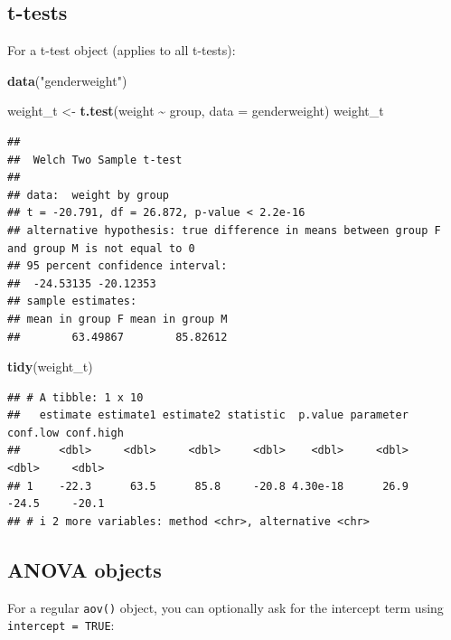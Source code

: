 \documentclass[
]{book}
\newenvironment{Shaded}{\begin{snugshade}}{\end{snugshade}}
\newcommand{\AttributeTok}[1]{\textcolor[rgb]{0.13,0.29,0.53}{#1}}
\newcommand{\FunctionTok}[1]{\textcolor[rgb]{0.13,0.29,0.53}{\textbf{#1}}}
\newcommand{\NormalTok}[1]{#1}
\newcommand{\OtherTok}[1]{\textcolor[rgb]{0.56,0.35,0.01}{#1}}
\newcommand{\SpecialCharTok}[1]{\textcolor[rgb]{0.81,0.36,0.00}{\textbf{#1}}}
\newcommand{\StringTok}[1]{\textcolor[rgb]{0.31,0.60,0.02}{#1}}
\begin{document}
\subsection{t-tests}\label{t-tests-1}

For a t-test object (applies to all t-tests):

\begin{Shaded}
\begin{Highlighting}[]
\FunctionTok{data}\NormalTok{(}\StringTok{"genderweight"}\NormalTok{)}

\NormalTok{weight\_t }\OtherTok{\textless{}{-}} \FunctionTok{t.test}\NormalTok{(weight }\SpecialCharTok{\textasciitilde{}}\NormalTok{ group, }\AttributeTok{data =}\NormalTok{ genderweight)}
\NormalTok{weight\_t}
\end{Highlighting}
\end{Shaded}

\begin{verbatim}
## 
##  Welch Two Sample t-test
## 
## data:  weight by group
## t = -20.791, df = 26.872, p-value < 2.2e-16
## alternative hypothesis: true difference in means between group F and group M is not equal to 0
## 95 percent confidence interval:
##  -24.53135 -20.12353
## sample estimates:
## mean in group F mean in group M 
##        63.49867        85.82612
\end{verbatim}

\begin{Shaded}
\begin{Highlighting}[]
\FunctionTok{tidy}\NormalTok{(weight\_t)}
\end{Highlighting}
\end{Shaded}

\begin{verbatim}
## # A tibble: 1 x 10
##   estimate estimate1 estimate2 statistic  p.value parameter conf.low conf.high
##      <dbl>     <dbl>     <dbl>     <dbl>    <dbl>     <dbl>    <dbl>     <dbl>
## 1    -22.3      63.5      85.8     -20.8 4.30e-18      26.9    -24.5     -20.1
## # i 2 more variables: method <chr>, alternative <chr>
\end{verbatim}

\subsection{ANOVA objects}\label{anova-objects}

For a regular \texttt{aov()} object, you can optionally ask for the intercept term using \texttt{intercept\ =\ TRUE}:
\end{document}
